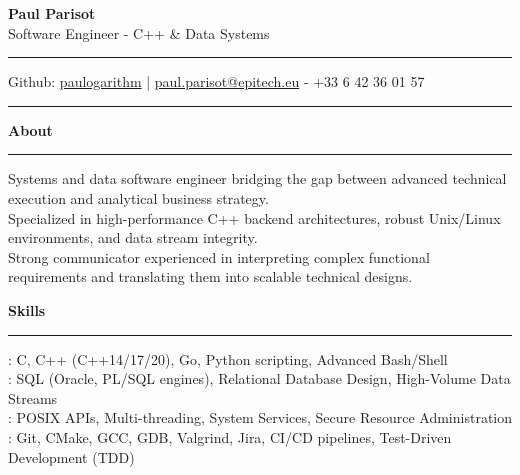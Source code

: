 \documentclass[9pt]{extarticle}
\begin{document}
\begin{center}
    {\huge\bfseries Paul Parisot}
    \\[10pt]
    {\Large Software Engineer - C++ \& Data Systems}
    \\
\end{center}

\par\vspace{-10pt}
\rule{\linewidth}{0.4pt}
\par\vspace{-10pt}

\begin{center}
    Github: \href{https://github.com/paulogarithm}{paulogarithm} 
    \quad | \quad 
    \href{mailto:paul.parisot@epitech.eu}{paul.parisot@epitech.eu} - +33 6 42 36 01 57
\end{center}

\par\vspace{-15pt}
\rule{\linewidth}{0.4pt}
\par\vspace{5pt}

{\large\bfseries About}
\par\vspace{-8pt}
\rule{\linewidth}{0.4pt}
\par\vspace{5pt}

Systems and data software engineer bridging the gap between advanced technical execution and analytical business strategy. \\
Specialized in high-performance C++ backend architectures, robust Unix/Linux environments, and data stream integrity. \\
Strong communicator experienced in interpreting complex functional requirements and translating them into scalable technical designs.

\par\vspace{5pt}

{\large\bfseries Skills}
\par\vspace{-8pt}
\rule{\linewidth}{0.4pt}
\par\vspace{5pt}

\hspace*{5pt}{\bfseries Core Languages}: C, C++ (C++14/17/20), Go, Python scripting, Advanced Bash/Shell \\
\hspace*{5pt}{\bfseries Data \& Databases}: SQL (Oracle, PL/SQL engines), Relational Database Design, High-Volume Data Streams \\
\hspace*{5pt}{\bfseries Unix/Linux Systems}: POSIX APIs, Multi-threading, System Services, Secure Resource Administration \\
\hspace*{5pt}{\bfseries Engineering Tooling}: Git, CMake, GCC, GDB, Valgrind, Jira, CI/CD pipelines, Test-Driven Development (TDD)
\end{document}
